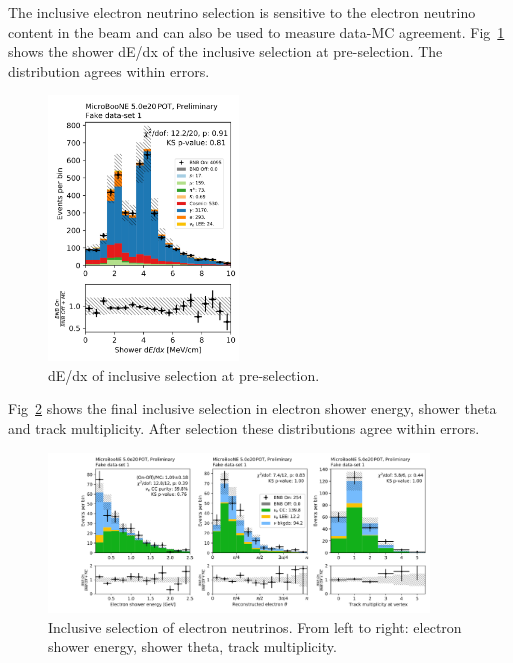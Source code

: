 The inclusive electron neutrino selection is sensitive to the electron neutrino content in the beam and can also be used to measure data-MC agreement.  Fig~\ref{fig:fakedata:set1:inc_presel} shows the shower dE/dx of the inclusive selection at pre-selection.  The distribution agrees within errors.   

\begin{figure}[H]
\begin{center}
\includegraphics[width=0.45\textwidth]{Fakedata/set1/inc_presel.pdf}
\caption{\label{fig:fakedata:set1:inc_presel} dE/dx of inclusive selection at pre-selection.}
\end{center}
\end{figure}

Fig~\ref{fig:fakedata:set1:inc_postsel} shows the final inclusive selection in electron shower energy, shower theta and track multiplicity.  After selection these distributions agree within errors.

\begin{figure}[H]
\begin{center}
\includegraphics[width=0.9\textwidth]{Fakedata/set1/inc_postsel.pdf}
\caption{\label{fig:fakedata:set1:inc_postsel} Inclusive selection of electron neutrinos. From left to right: electron shower energy, shower theta, track multiplicity.}
\end{center}
\end{figure}

